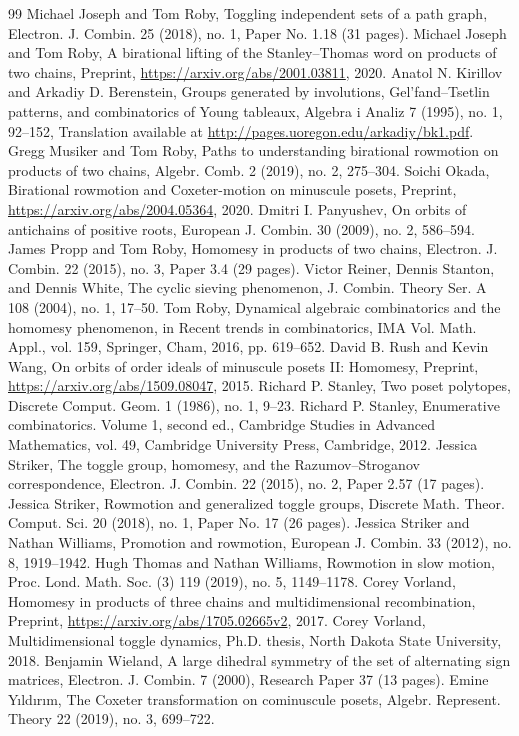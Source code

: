 \documentclass[10pt]{amsart}
\theoremstyle{definition}
\begin{document}
\begin{thebibliography}{99}
 Michael Joseph and Tom Roby, Toggling independent sets of a path graph, Electron. J. Combin. 25 (2018), no. 1, Paper No. 1.18 (31 pages).
 Michael Joseph and Tom Roby, A birational lifting of the Stanley--Thomas word on products of two chains, Preprint, \url{https://arxiv.org/abs/2001.03811}, 2020.
 Anatol N. Kirillov and Arkadiy D. Berenstein, Groups generated by involutions, Gel'fand--Tsetlin patterns, and combinatorics of Young tableaux, Algebra i Analiz 7 (1995), no. 1, 92--152, Translation available at \url{http://pages.uoregon.edu/arkadiy/bk1.pdf}.
 Gregg Musiker and Tom Roby, Paths to understanding birational rowmotion on products of two chains, Algebr. Comb. 2 (2019), no. 2, 275--304.
 Soichi Okada, Birational rowmotion and Coxeter-motion on minuscule posets, Preprint, \url{https://arxiv.org/abs/2004.05364}, 2020.
 Dmitri I. Panyushev, On orbits of antichains of positive roots, European J. Combin. 30 (2009), no. 2, 586--594.
 James Propp and Tom Roby, Homomesy in products of two chains, Electron. J. Combin. 22 (2015), no. 3, Paper 3.4 (29 pages).
 Victor Reiner, Dennis Stanton, and Dennis White, The cyclic sieving phenomenon, J. Combin. Theory Ser. A 108 (2004), no. 1, 17--50.
 Tom Roby, Dynamical algebraic combinatorics and the homomesy phenomenon, in Recent trends in combinatorics, IMA Vol. Math. Appl., vol. 159, Springer, Cham, 2016, pp. 619--652.
 David B. Rush and Kevin Wang, On orbits of order ideals of minuscule posets II: Homomesy, Preprint, \url{https://arxiv.org/abs/1509.08047}, 2015.
 Richard P. Stanley, Two poset polytopes, Discrete Comput. Geom. 1 (1986), no. 1, 9--23.
 Richard P. Stanley, Enumerative combinatorics. Volume 1, second ed., Cambridge Studies in Advanced Mathematics, vol. 49, Cambridge University Press, Cambridge, 2012.
 Jessica Striker, The toggle group, homomesy, and the Razumov--Stroganov correspondence, Electron. J. Combin. 22 (2015), no. 2, Paper 2.57 (17 pages).
 Jessica Striker, Rowmotion and generalized toggle groups, Discrete Math. Theor. Comput. Sci. 20 (2018), no. 1, Paper No. 17 (26 pages).
 Jessica Striker and Nathan Williams, Promotion and rowmotion, European J. Combin. 33 (2012), no. 8, 1919--1942.
 Hugh Thomas and Nathan Williams, Rowmotion in slow motion, Proc. Lond. Math. Soc. (3) 119 (2019), no. 5, 1149--1178.
 Corey Vorland, Homomesy in products of three chains and multidimensional recombination, Preprint, \url{https://arxiv.org/abs/1705.02665v2}, 2017.
 Corey Vorland, Multidimensional toggle dynamics, Ph.D. thesis, North Dakota State University, 2018.
 Benjamin Wieland, A large dihedral symmetry of the set of alternating sign matrices, Electron. J. Combin. 7 (2000), Research Paper 37 (13 pages).
 Emine Yıldırım, The Coxeter transformation on cominuscule posets, Algebr. Represent. Theory 22 (2019), no. 3, 699--722.
\end{thebibliography}
\end{document}
